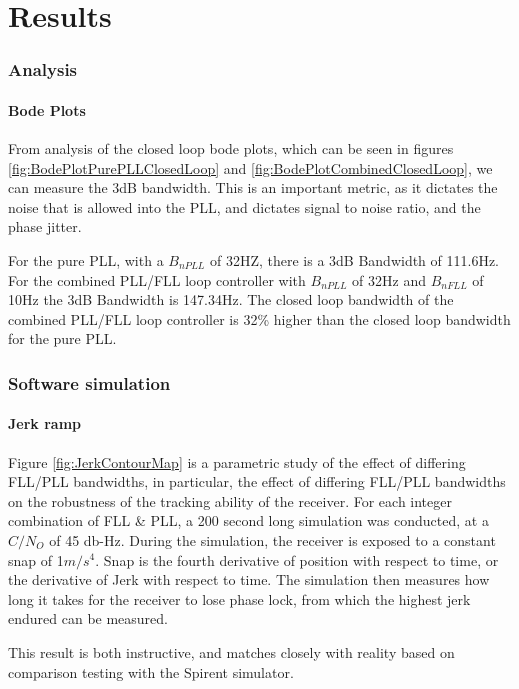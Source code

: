 \chapter{Results}\label{ch:Results}

\subsection{Analysis}


\subsubsection{Bode Plots}

From analysis of the closed loop bode plots, which can be seen in figures \ref{fig:BodePlotPurePLLClosedLoop} and \ref{fig:BodePlotCombinedClosedLoop}, we can measure the 3dB bandwidth. This is an important metric, as it dictates the noise that is allowed into the PLL, and dictates signal to noise ratio, and the phase jitter. 

For the pure PLL, with a $B_{nPLL}$ of 32HZ, there is a 3dB Bandwidth of 111.6Hz. For the combined PLL/FLL loop controller with  $B_{nPLL}$ of 32Hz and  $B_{nFLL}$ of 10Hz the 3dB Bandwidth is 147.34Hz. The closed loop bandwidth of the combined PLL/FLL loop controller is 32\% higher than the closed loop bandwidth for the pure PLL.


\subsection{Software simulation}

\subsubsection{Jerk ramp}

Figure \ref{fig:JerkContourMap} is a parametric study of the effect of differing FLL/PLL bandwidths, in particular, the effect of differing FLL/PLL bandwidths on the robustness of the tracking ability of the receiver. For each integer combination of FLL \& PLL, a 200 second long simulation was conducted, at a $C/N_O$ of 45 db-Hz. During the simulation, the receiver is exposed to a constant snap of 1$m/s^4$. Snap is the fourth derivative of position with respect to time, or the derivative of Jerk with respect to time. The simulation then measures how long it takes for the receiver to lose phase lock, from which the highest jerk endured can be measured. 

This result is both instructive, and matches closely with reality based on comparison testing with the Spirent simulator. 

